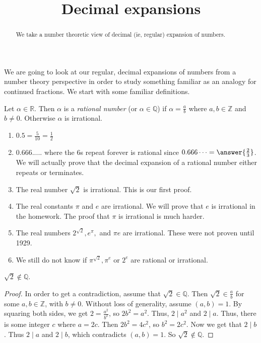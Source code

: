 \documentclass{ximera}
\title{Decimal expansions}
\begin{document}
  
\begin{abstract}  We take a number theoretic view of decimal (ie, regular) expansion of numbers.
\end{abstract}
\maketitle  

 We are going to look at our regular, decimal expansions of numbers from a number theory perspective in order to study something familiar as an analogy for continued fractions.  We start with some familiar definitions.
 
\begin{definition}
 Let $\alpha\in\mathbb{R}$. Then $\alpha$ is a \emph{rational number} (or $\alpha\in\mathbb{Q}$) if $\alpha=\frac{a}{b}$ where $a,b\in\mathbb{Z}$ and $b\neq 0$. Otherwise $\alpha$ is irrational.
\end{definition}

\begin{example}
\begin{enumerate}
 \item $0.5=\frac{5}{10}=\frac{1}{2}$ 
 \item $0.666.....$ where the $6$s repeat forever is rational since $0.666\dots=\answer{\frac{2}{3}}$. We will actually prove that the decimal expansion of a rational number either repeats or terminates.
 \item The real number $\sqrt{2}$ is irrational. This is our first proof.
 \item The real constants $\pi$ and $e$ are irrational. We will prove that $e$ is irrational in the homework. The proof that $\pi$ is irrational is much harder.
 \item The real numbers $2^{\sqrt{2}}, e^\pi,$ and $\pi e$ are irrational. These were not proven until 1929.
 \item We still do not know if $\pi^{\sqrt{2}}, \pi^e$ or $2^e$ are rational or irrational.
\end{enumerate}
\end{example}

\begin{theorem}
 $\sqrt{2}\not\in\mathbb{Q}$.
\end{theorem}
\begin{proof}
 In order to get a contradiction, assume that $\sqrt{2}\in\mathbb{Q}$. Then $\sqrt{2}\in\frac{a}{b}$ for some $a,b\in\mathbb{Z}$, with $b\neq 0$. Without loss of generality, assume $(a,b)=1$. By squaring both sides, we get $2=\frac{a^2}{b^2}$, so $2b^2=a^2$. Thus, $2\mid a^2$ and $2\mid a$. Thus, there is some integer $c$ where $a=2c$. Then $2b^2=4c^2$, so $b^2=2c^2$.  Now we get that $2\mid b$. Thus $2\mid a$ and $2\mid b$, which contradicts $(a,b)=1$. So $\sqrt{2}\not\in\mathbb{Q}$.
\end{proof}
\end{document}
